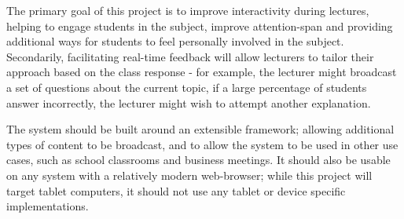 \documentclass[a4papert,11pt,notitlepage]{ltxdoc}
\begin{document}
The primary goal of this project is to improve interactivity during lectures, helping to engage students in the subject, improve attention-span and providing additional ways for students to feel personally involved in the subject. Secondarily, facilitating real-time feedback will allow lecturers to tailor their approach based on the class response - for example, the lecturer might broadcast a set of questions about the current topic, if a large percentage of students answer incorrectly, the lecturer might wish to attempt another explanation.

The system should be built around an extensible framework; allowing additional types of content to be broadcast, and to allow the system to be used in other use cases, such as school classrooms and business meetings. It should also be usable on any system with a relatively modern web-browser; while this project will target tablet computers, it should not use any tablet or device specific implementations.
\end{document}
